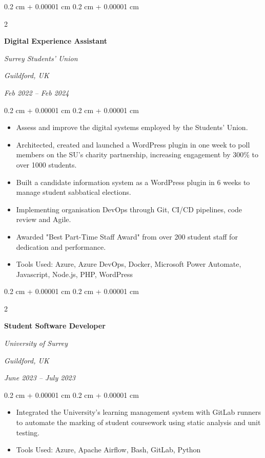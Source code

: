 \documentclass[10pt, letterpaper]{article}
\newenvironment{highlights}{
    \begin{itemize}[
        topsep=0.10 cm,
        parsep=0.10 cm,
        partopsep=0pt,
        itemsep=0pt,
        leftmargin=0.4 cm + 10pt
    ]
}{
    \end{itemize}
} %
\newenvironment{onecolentry}{
    \begin{adjustwidth}{
        0.2 cm + 0.00001 cm
    }{
        0.2 cm + 0.00001 cm
    }
}{
    \end{adjustwidth}
} %
\newenvironment{twocolentry}[2][]{
    \onecolentry
    \def\secondColumn{#2}
    \setcolumnwidth{\fill, 8 cm}
    \begin{paracol}{2}
}{
    \switchcolumn \raggedleft \secondColumn
    \end{paracol}
    \endonecolentry
} %
\begin{document}
        \vspace{0.2 cm}

        \begin{twocolentry}{
        \textit{Guildford, UK}    
            
        \textit{Feb 2022 – Feb 2024}}
            \textbf{Digital Experience Assistant}
            
            \textit{Surrey Students' Union}
        \end{twocolentry}

        \vspace{0.10 cm}
        \begin{onecolentry}
            \begin{highlights}
                \item Assess and improve the digital systems employed by the Students' Union.
                \item Architected, created and launched a WordPress plugin in one week to poll members on the SU's charity partnership, increasing engagement by 300\% to over 1000 students.
                \item Built a candidate information system as a WordPress plugin in 6 weeks to manage student sabbatical elections.
                \item Implementing organisation DevOps through Git, CI/CD pipelines, code review and Agile.
                \item Awarded "Best Part-Time Staff Award" from over 200 student staff for dedication and performance.
                \item Tools Used: Azure, Azure DevOps, Docker, Microsoft Power Automate, Javascript, Node.js, PHP, WordPress
            \end{highlights}
        \end{onecolentry}


        \vspace{0.2 cm}

        \begin{twocolentry}{
        \textit{Guildford, UK}    
            
        \textit{June 2023 – July 2023}}
            \textbf{Student Software Developer}
            
            \textit{University of Surrey}
        \end{twocolentry}

        \vspace{0.10 cm}
        \begin{onecolentry}
            \begin{highlights}
                \item Integrated the University's learning management system with GitLab runners to automate the marking of student coursework using static analysis and unit testing.
                \item Tools Used: Azure, Apache Airflow, Bash, GitLab, Python
            \end{highlights}
        \end{onecolentry}
\end{document}
